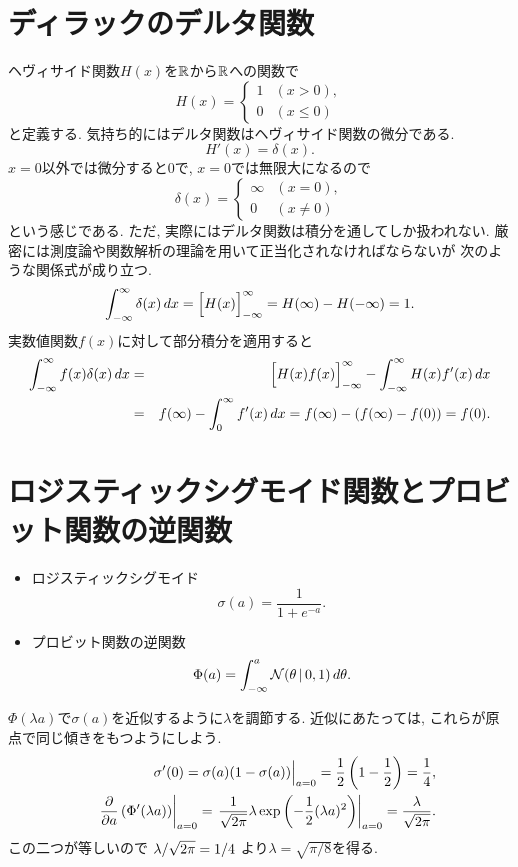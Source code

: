 \section{ディラックのデルタ関数}
ヘヴィサイド関数$H(x)$を$\mathbb{R}$から$\mathbb{R}$への関数で
$$
H(x)=
\begin{cases}
1 & (x>0), \\
0 & (x \le 0)
\end{cases}
$$
と定義する. 気持ち的にはデルタ関数はヘヴィサイド関数の微分である.
$$
H'(x) = \delta(x).
$$
$x=0$以外では微分すると$0$で, $x=0$では無限大になるので
$$
\delta(x)=
\begin{cases}
\infty & (x=0), \\
0 & (x \neq 0)
\end{cases}
$$
という感じである.
ただ, 実際にはデルタ関数は積分を通してしか扱われない. 厳密には測度論や関数解析の理論を用いて正当化されなければならないが
次のような関係式が成り立つ.
$$
\int_{-\infty}^\infty \delta(x)\,dx = \Bigl[H(x)\Bigr]_{-\infty}^\infty = H(\infty) - H(-\infty) = 1.
$$
実数値関数$f(x)$に対して部分積分を適用すると
\begin{eqnarray*}
\int_{-\infty}^\infty f(x) \delta(x)\,dx &=& \Bigl[H(x)f(x)\Bigr]_{-\infty}^\infty - \int_{-\infty}^\infty H(x) f'(x)\,dx\\
 &=& f(\infty) - \int_0^\infty f'(x)\,dx
 = f(\infty) - (f(\infty) - f(0))
 = f(0).
\end{eqnarray*}
\vspace{0pt}

\section{ロジスティックシグモイド関数とプロビット関数の逆関数}
\begin{itemize}
\item[] ロジスティックシグモイド
$$\sigma(a) = \frac{1}{1+e^{-a}}.$$
\item[] プロビット関数の逆関数
$$\Phi(a) = \int_{-\infty}^a {\cal N}(\theta\,|\,0,1)\,d\theta.$$
\end{itemize}
$\Phi(\lambda a)$で$\sigma(a)$を近似するように$\lambda$を調節する.
近似にあたっては, これらが原点で同じ傾きをもつようにしよう.
\pagebreak
\begin{eqnarray*}&&
\sigma'(0)
=\sigma(a)(1-\sigma(a))\Bigr|_{a=0}
=\frac{1}{2}\left(1-\frac{1}{2}\right)=\frac{1}{4},
\\&&
\left.\frac{\partial}{\partial a}\left(\Phi'(\lambda a)\right)\right|_{a=0}
=\left.\frac{1}{\sqrt{2\pi}}\lambda
 \exp\left(-\frac{1}{2}(\lambda a)^2\right)\right|_{a=0}
=\frac{\lambda}{\sqrt{2\pi}}.
\end{eqnarray*}
この二つが等しいので
$
\lambda/\sqrt{2\pi}=1/4
$
より$\lambda=\sqrt{\pi/8}$を得る.

